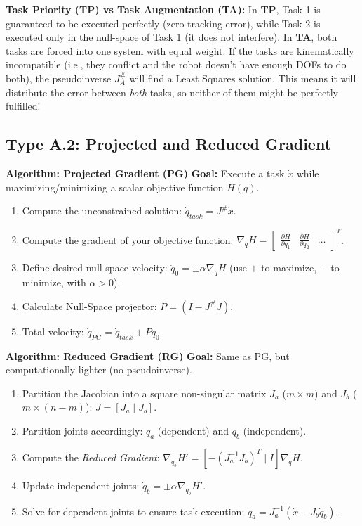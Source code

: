 \documentclass[11pt,a4paper]{article}
\begin{document}
\begin{examtip}
\textbf{Task Priority (TP) vs Task Augmentation (TA):} 
In \textbf{TP}, Task 1 is guaranteed to be executed perfectly (zero tracking error), while Task 2 is executed only in the null-space of Task 1 (it does not interfere). 
In \textbf{TA}, both tasks are forced into one system with equal weight. If the tasks are kinematically incompatible (i.e., they conflict and the robot doesn't have enough DOFs to do both), the pseudoinverse $J_A^\#$ will find a Least Squares solution. This means it will distribute the error between \textit{both} tasks, so neither of them might be perfectly fulfilled!
\end{examtip}


\subsection{Type A.2: Projected and Reduced Gradient}

 \textbf{Algorithm: Projected Gradient (PG)}
\textbf{Goal:} Execute a task $\dot{x}$ while maximizing/minimizing a scalar objective function $H(q)$.
\begin{enumerate}
    \item Compute the unconstrained solution: $\dot{q}_{task} = J^\# \dot{x}$.
    \item Compute the gradient of your objective function: $\nabla_q H = \begin{bmatrix} \frac{\partial H}{\partial q_1} & \frac{\partial H}{\partial q_2} & \dots \end{bmatrix}^T$.
    \item Define desired null-space velocity: $\dot{q}_0 = \pm \alpha \nabla_q H$ (use $+$ to maximize, $-$ to minimize, with $\alpha > 0$).
    \item Calculate Null-Space projector: $P = (I - J^\# J)$.
    \item Total velocity: $\dot{q}_{PG} = \dot{q}_{task} + P \dot{q}_0$.
\end{enumerate}


 \textbf{Algorithm: Reduced Gradient (RG)}
\textbf{Goal:} Same as PG, but computationally lighter (no pseudoinverse).
\begin{enumerate}
    \item Partition the Jacobian into a square non-singular matrix $J_a$ ($m \times m$) and $J_b$ ($m \times (n-m)$): $J = [J_a \mid J_b]$.
    \item Partition joints accordingly: $q_a$ (dependent) and $q_b$ (independent).
    \item Compute the \textit{Reduced Gradient}: $\nabla_{q_b} H' = [-(J_a^{-1} J_b)^T \mid I] \nabla_q H$.
    \item Update independent joints: $\dot{q}_b = \pm \alpha \nabla_{q_b} H'$.
    \item Solve for dependent joints to ensure task execution: $\dot{q}_a = J_a^{-1}(\dot{x} - J_b \dot{q}_b)$.
\end{enumerate}
\end{document}
